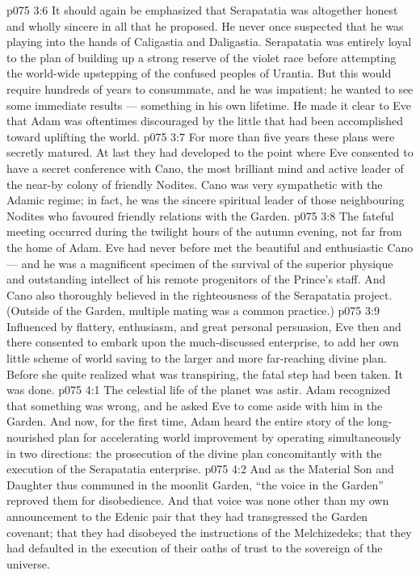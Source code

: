 \vs p075 3:6 It should again be emphasized that Serapatatia was altogether honest and wholly sincere in all that he proposed. He never once suspected that he was playing into the hands of Caligastia and Daligastia. Serapatatia was entirely loyal to the plan of building up a strong reserve of the violet race before attempting the world\hyp{}wide upstepping of the confused peoples of Urantia. But this would require hundreds of years to consummate, and he was impatient; he wanted to see some immediate results --- something in his own lifetime. He made it clear to Eve that Adam was oftentimes discouraged by the little that had been accomplished toward uplifting the world.
\vs p075 3:7 \pc For more than five years these plans were secretly matured. At last they had developed to the point where Eve consented to have a secret conference with Cano, the most brilliant mind and active leader of the near-by colony of friendly Nodites. Cano was very sympathetic with the Adamic regime; in fact, he was the sincere spiritual leader of those neighbouring Nodites who favoured friendly relations with the Garden.
\vs p075 3:8 The fateful meeting occurred during the twilight hours of the autumn evening, not far from the home of Adam. Eve had never before met the beautiful and enthusiastic Cano --- and he was a magnificent specimen of the survival of the superior physique and outstanding intellect of his remote progenitors of the Prince’s staff. And Cano also thoroughly believed in the righteousness of the Serapatatia project. (Outside of the Garden, multiple mating was a common practice.)
\vs p075 3:9 Influenced by flattery, enthusiasm, and great personal persuasion, Eve then and there consented to embark upon the much\hyp{}discussed enterprise, to add her own little scheme of world saving to the larger and more far\hyp{}reaching divine plan. Before she quite realized what was transpiring, the fatal step had been taken. It was done.
\vs p075 4:1 The celestial life of the planet was astir. Adam recognized that something was wrong, and he asked Eve to come aside with him in the Garden. And now, for the first time, Adam heard the entire story of the long\hyp{}nourished plan for accelerating world improvement by operating simultaneously in two directions: the prosecution of the divine plan concomitantly with the execution of the Serapatatia enterprise.
\vs p075 4:2 And as the Material Son and Daughter thus communed in the moonlit Garden, “the voice in the Garden” reproved them for disobedience. And that voice was none other than my own announcement to the Edenic pair that they had transgressed the Garden covenant; that they had disobeyed the instructions of the Melchizedeks; that they had defaulted in the execution of their oaths of trust to the sovereign of the universe.
